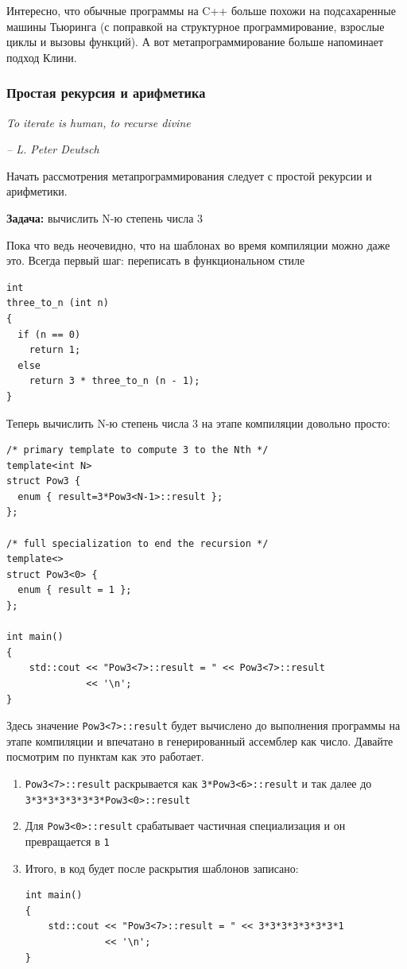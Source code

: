 \documentclass[a4paper,12pt,oneside]{article}
\begin{document}
Интересно, что обычные программы на C++ больше похожи на подсахаренные машины Тьюринга (с поправкой на структурное программирование, взрослые циклы и вызовы функций). А вот метапрограммирование больше напоминает подход Клини.

\subsubsection{Простая рекурсия и арифметика}\label{SimpleRecursion}

\hfill\textit{To iterate is human, to recurse divine}{\vspace{0.5em}}

\hfill\textit{-- L. Peter Deutsch}

Начать рассмотрения метапрограммирования следует с простой рекурсии и арифметики. 

\textbf{Задача:} вычислить N-ю степень числа 3

Пока что ведь неочевидно, что на шаблонах во время компиляции можно даже это. Всегда первый шаг: переписать в функциональном стиле

\begin{lstlisting}
int
three_to_n (int n)
{
  if (n == 0)
    return 1;
  else
    return 3 * three_to_n (n - 1);
}
\end{lstlisting}

Теперь вычислить N-ю степень числа 3 на этапе компиляции довольно просто:

\begin{lstlisting}
/* primary template to compute 3 to the Nth */
template<int N> 
struct Pow3 { 
  enum { result=3*Pow3<N-1>::result }; 
}; 

/* full specialization to end the recursion */
template<> 
struct Pow3<0> { 
  enum { result = 1 }; 
}; 

int main() 
{ 
    std::cout << "Pow3<7>::result = " << Pow3<7>::result 
              << '\n'; 
} 
\end{lstlisting}

Здесь значение \lstinline!Pow3<7>::result! будет вычислено до выполнения программы на этапе компиляции и впечатано в генерированный ассемблер как число. Давайте посмотрим по пунктам как это работает.

\begin{enumerate}
\item
\lstinline!Pow3<7>::result! раскрывается как \lstinline!3*Pow3<6>::result! и так далее до \lstinline!3*3*3*3*3*3*3*Pow3<0>::result!
\item
Для \lstinline!Pow3<0>::result! срабатывает частичная специализация и он превращается в \lstinline!1!
\item
Итого, в код будет после раскрытия шаблонов записано:
\begin{lstlisting}
int main() 
{ 
    std::cout << "Pow3<7>::result = " << 3*3*3*3*3*3*3*1                                         
              << '\n'; 
} 
\end{lstlisting}
\end{enumerate}
\end{document}
